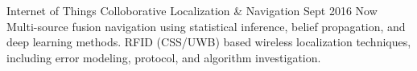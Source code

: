         \position
            {Internet of Things}
			{Colloborative Localization \& Navigation}
			{Sept 2016 \textemdash{} Now}
			{
				Multi-source fusion navigation using statistical inference, belief propagation, and deep learning methods. RFID (CSS/UWB) based wireless localization techniques, including error modeling, protocol, and algorithm investigation.
			}
\fi